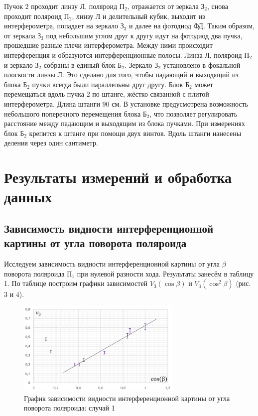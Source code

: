 \documentclass[a4paper]{article}
\begin{document}
Пучок 2 проходит линзу Л, поляроид П$_2$, отражается от зеркала З$_2$, снова проходит поляроид П$_2$, линзу Л и делительный кубик, выходит из интерферометра, попадает на зеркало З$_3$ и далее на фотодиод ФД. Таким образом, от зеркала З$_3$ под небольшим углом друг к другу идут на фотодиод два пучка, прошедшие разные плечи интерферометра. Между ними происходит интерференция и образуются интерференционные полосы. Линза Л,
поляроид П$_2$ и зеркало З$_2$ собраны в единый блок Б$_2$. Зеркало З$_2$ установлено в фокальной плоскости линзы Л. Это сделано для того, чтобы падающий и выходящий из блока Б$_2$ пучки всегда были параллельны друг другу. Блок Б$_2$ может перемещаться вдоль пучка 2 по штанге, жёстко связанной с плитой интерферометра. Длина штанги 90 см. В установке предусмотрена возможность небольшого поперечного перемещения блока Б$_2$, что позволяет регулировать расстояние между падающим и выходящим из блока пучками. При измерениях блок Б$_2$ крепится к штанге при помощи двух винтов. Вдоль штанги нанесены деления через один сантиметр.

\section{Результаты измерений и обработка данных}

\subsection{Зависимость видности интерференционной картины от угла поворота поляроида}

Исследуем зависимость видности интерференционной картины от угла $\beta$ поворота поляроида П$_1$ при нулевой разности хода. Результаты занесём в таблицу 1. По таблице построим графики зависимостей $V_3(\cos{\beta})$ и $V_3(\cos^2{\beta})$ (рис. 3 и 4).

\begin{figure}[ht!]
    \centering
    \includegraphics[width = 0.7\textwidth]{image/graph1.png}
    \caption{График зависимости видности интерференционной картины от угла поворота поляроида: случай 1}
\end{figure}
\end{document}

